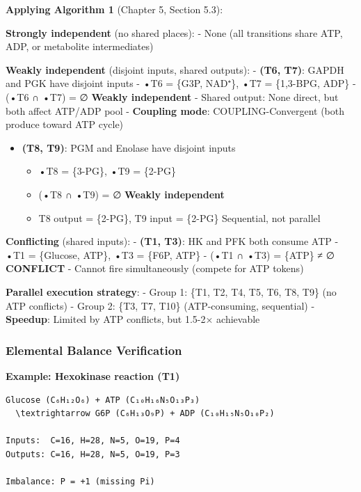 \textbf{Applying Algorithm 1} (Chapter 5, Section 5.3):

\textbf{Strongly independent} (no shared places): - None (all
transitions share ATP, ADP, or metabolite intermediates)

\textbf{Weakly independent} (disjoint inputs, shared outputs): -
\textbf{(T6, T7)}: GAPDH and PGK have disjoint inputs - •T6 = \{G3P,
NAD⁺\}, •T7 = \{1,3-BPG, ADP\} - (•T6 ∩ •T7) = ∅ \textrightarrow \textbf{Weakly
independent} - Shared output: None direct, but both affect ATP/ADP pool
- \textbf{Coupling mode}: COUPLING-Convergent (both produce toward ATP
cycle)

\begin{itemize}
\tightlist
\item
  \textbf{(T8, T9)}: PGM and Enolase have disjoint inputs

  \begin{itemize}
  \tightlist
  \item
    •T8 = \{3-PG\}, •T9 = \{2-PG\}
  \item
    (•T8 ∩ •T9) = ∅ \textrightarrow \textbf{Weakly independent}
  \item
    T8 output = \{2-PG\}, T9 input = \{2-PG\} \textrightarrow Sequential, not parallel
  \end{itemize}
\end{itemize}

\textbf{Conflicting} (shared inputs): - \textbf{(T1, T3)}: HK and PFK
both consume ATP - •T1 = \{Glucose, ATP\}, •T3 = \{F6P, ATP\} - (•T1 ∩
•T3) = \{ATP\} ≠ ∅ \textrightarrow \textbf{CONFLICT} - Cannot fire simultaneously
(compete for ATP tokens)

\textbf{Parallel execution strategy}: - Group 1: \{T1, T2, T4, T5, T6,
T8, T9\} (no ATP conflicts) - Group 2: \{T3, T7, T10\} (ATP-consuming,
sequential) - \textbf{Speedup}: Limited by ATP conflicts, but 1.5-2×
achievable

\hypertarget{elemental-balance-verification}{%
\subsubsection{Elemental Balance
Verification}\label{elemental-balance-verification}}

\textbf{Example: Hexokinase reaction (T1)}

\begin{lstlisting}
Glucose (C₆H₁₂O₆) + ATP (C₁₀H₁₆N₅O₁₃P₃) 
  \textrightarrow G6P (C₆H₁₃O₉P) + ADP (C₁₀H₁₅N₅O₁₀P₂)

Inputs:  C=16, H=28, N=5, O=19, P=4
Outputs: C=16, H=28, N=5, O=19, P=3

Imbalance: P = +1 (missing Pi)
\end{lstlisting}


